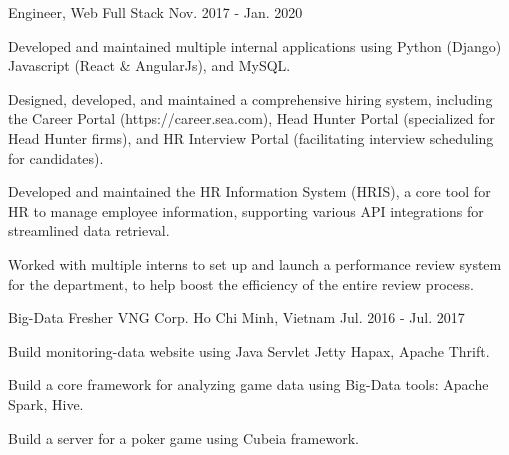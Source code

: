 \begin{cventries}
  \cventry
    {Engineer, Web Full Stack} %
    {} %
    {} %
    {Nov. 2017 - Jan. 2020} %
    {
      \begin{cvitems} %
        \item {Developed and maintained multiple internal applications using Python (Django) Javascript (React \& AngularJs), and MySQL.}
        \item {Designed, developed, and maintained a comprehensive hiring system, including the Career Portal (https://career.sea.com), Head Hunter Portal (specialized for Head Hunter firms), and HR Interview Portal (facilitating interview scheduling for candidates).}
        \item {Developed and maintained the HR Information System (HRIS), a core tool for HR to manage employee information, supporting various API integrations for streamlined data retrieval.}
        \item {Worked with multiple interns to set up and launch a performance review system for the department, to help boost the efficiency of the entire review process.}
      \end{cvitems}
    }

  \cventry
    {Big-Data Fresher} %
    {VNG Corp.} %
    {Ho Chi Minh, Vietnam} %
    {Jul. 2016 - Jul. 2017} %
    {
      \begin{cvitems}
        \item {Build monitoring-data website using Java Servlet Jetty Hapax, Apache Thrift.}
        \item {Build a core framework for analyzing game data using Big-Data tools: Apache Spark, Hive.}
        \item {Build a server for a poker game using Cubeia framework.}
      \end{cvitems}
    }
\end{cventries}
